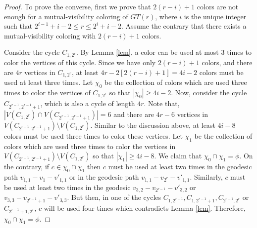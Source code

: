 \documentclass[10pt,a4paper]{amsart}
\begin{document}
\begin{proof}
To prove the converse, first we prove that $2(r-i)+1$ colors are not enough for a mutual-visibility coloring of $GT(r)$, where $i$ is the unique integer such that $2^{i-1} + i-2 \leq r \leq 2^i+i-2$. Assume the contrary that there exists a mutual-visibility coloring with $2(r-i)+1$ colors.\par

Consider the cycle $C_{1,2^r}$. By Lemma \ref{lem}, a color can be used at most 3 times to color the vertices of this cycle. Since we have only $2(r-i)+1$ colors, and there are $4r$ vertices in $C_{1,2^r}$, at least $4r - 2[2(r-i)+1] = 4i-2$ colors must be used at least three times. Let $\chi_0$ be the collection of colors which are used three times to color the vertices of $C_{1,2^r}$ so that $|\chi_0|\geq4i-2$. Now, consider the cycle $C_{2^{r-1},2^{r-1}+1}$, which is also a cycle of length $4r$. Note that, $|V(C_{1,2^r}) \cap V(C_{2^{r-1},2^{r-1}+1})| = 6$ and there are $4r-6$ vertices in $V(C_{2^{r-1},2^{r-1}+1}) \setminus V(C_{1,2^r}) $. Similar to the discussion above, at least $4i - 8$ colors  must be used three times to color these vertices. Let $\chi_1$  be the collection of colors which are used three times to color the vertices in $V(C_{2^{r-1},2^{r-1}+1}) \setminus V(C_{1,2^r})$ so that $|\chi_1|\geq4i - 8$. We claim that $\chi_0  \cap \chi_1  = \phi$. On the contrary, if $c \in \chi_0  \cap \chi_1$ then $c$ must be used at least two times in the geodesic path $v_{1,1}-v_1-v'_{1,1}$ or in the geodesic path $v_{1,1}-v_{2^r}-v'_{1,1}$. Similarly, $c$ must be used at least two times in the geodesic $v_{3,2}-v_{2^{r-1}}-v'_{3,2}$ or $v_{3,3}-v_{2^{r-1}+1}-v'_{3,3}$. But then, in one of the cycles $C_{1,2^{r-1}}, C_{1,2^{r-1}+1}, C_{2^{r-1},2^r}$ or $C_{2^{r-1}+1,2^r}$, $c$ will be used four times which contradicts Lemma \ref{lem}. Therefore,$\chi_0  \cap \chi_1  = \phi$.



\end{proof}
\end{document}
